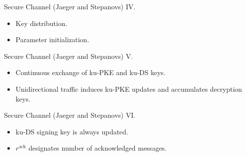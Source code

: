 \documentclass{beamer}
\renewcommand{\t}{\text}
\begin{document}
\begin{frame}{Secure Channel (Jaeger and Stepanovs) IV.}
  \scriptsize
  \begin{minipage}[h]{0.65\textwidth}
      \begin{figure}[h]
        \centering
        \setlength{\fboxsep}{10pt}
        \scalebox{0.7}{%
        \fbox{%
          
        }
      }
    \end{figure}
    \end{minipage}
  \begin{minipage}[h]{0.34\textwidth}
      \begin{itemize}
      \item Key distribution.
      \item Parameter initialization.
      \end{itemize}
    \end{minipage}
\end{frame}

\begin{frame}{Secure Channel (Jaeger and Stepanovs) V.}
  \scriptsize
  \begin{minipage}[ht]{0.59\textwidth}
      \begin{figure}[ht]
        \centering
        \setlength{\fboxsep}{10pt}
        \scalebox{0.7}{%
        \fbox{%
          
        }
      }
    \end{figure}
    \end{minipage}
  \begin{minipage}[ht]{0.40\textwidth}
      \begin{itemize}
      \item Continuous exchange of ku-PKE and ku-DS keys.
      \item Unidirectional traffic induces ku-PKE updates
        and accumulates decryption keys.
      \end{itemize}
    \end{minipage}
\end{frame}

\begin{frame}{Secure Channel (Jaeger and Stepanovs) VI.}
  \scriptsize
  \begin{minipage}[h]{0.65\textwidth}
      \begin{figure}[ht]
        \centering
        \setlength{\fboxsep}{10pt}
        \scalebox{0.7}{%
        \fbox{%
          
        }
      }
    \end{figure}
    \end{minipage}
  \begin{minipage}[h]{0.34\textwidth}
      \begin{itemize}
      \item ku-DS signing key is always updated.
      \item $r^\t{ack}$ designates number of acknowledged messages.
      \end{itemize}
    \end{minipage}
\end{frame}
\end{document}
